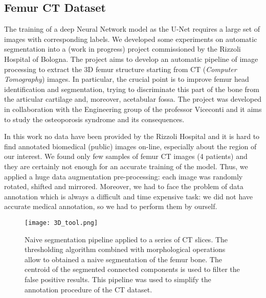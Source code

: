\documentclass{standalone}
\begin{document}
\subsection[CT Dataset]{Femur CT Dataset}\label{segmentation:ct}

The training of a deep Neural Network model as the U-Net requires a large set of images with corresponding labels.
We developed some experiments on automatic segmentation into a (work in progress) project commissioned by the Rizzoli Hospital of Bologna.
The project aims to develop an automatic pipeline of image processing to extract the 3D femur structure starting from CT (\emph{Computer Tomography}) images.
In particular, the crucial point is to improve femur head identification and segmentation, trying to discriminate this part of the bone from the articular cartilage and, moreover, acetabular fossa.
The project was developed in collaboration with the Engineering group of the professor Viceconti and it aims to study the osteoporosis syndrome and its consequences.

In this work no data have been provided by the Rizzoli Hospital and it is hard to find annotated biomedical (public) images on-line, especially about the region of our interest.
We found only few samples of femur CT images (4 patients) and they are certainly not enough for an accurate training of the model.
Thus, we applied a huge data augmentation pre-processing: each image was randomly rotated, shifted and mirrored.
Moreover, we had to face the problem of data annotation which is always a difficult and time expensive task: we did not have accurate medical annotation, so we had to perform them by ourself.

\begin{figure}[htbp]
\centering
\texttt{[image: 3D\_tool.png]}
\caption{Naive segmentation pipeline applied to a series of CT slices.
The thresholding algorithm combined with morphological operations allow to obtained a naive segmentation of the femur bone.
The centroid of the segmented connected components is used to filter the false positive results.
This pipeline was used to simplify the annotation procedure of the CT dataset.
}
\label{fig:3D_tool}
\end{figure}
\end{document}
